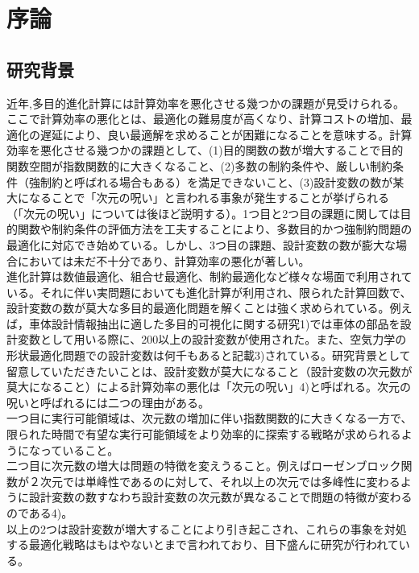 \documentclass[11pt,a4j,notitlepage]{jreport}
\begin{document}
\titleoutput

\gtabstract

\tableofcontents
\listoffigures
\listoftables

\clearpage
{}

\chapter{序論}
\section{研究背景}
近年,多目的進化計算には計算効率を悪化させる幾つかの課題が見受けられる。ここで計算効率の悪化とは、最適化の難易度が高くなり、計算コストの増加、最適化の遅延により、良い最適解を求めることが困難になることを意味する。計算効率を悪化させる幾つかの課題として、(1)目的関数の数が増大することで目的関数空間が指数関数的に大きくなること、(2)多数の制約条件や、厳しい制約条件（強制約と呼ばれる場合もある）を満足できないこと、(3)設計変数の数が某大になることで「次元の呪い」と言われる事象が発生することが挙げられる（「次元の呪い」については後ほど説明する）。1つ目と2つ目の課題に関しては目的関数や制約条件の評価方法を工夫することにより、多数目的かつ強制約問題の最適化に対応でき始めている。しかし、3つ目の課題、設計変数の数が膨大な場合においては未だ不十分であり、計算効率の悪化が著しい。
\\
進化計算は数値最適化、組合せ最適化、制約最適化など様々な場面で利用されている。それに伴い実問題においても進化計算が利用され、限られた計算回数で、設計変数の数が莫大な多目的最適化問題を解くことは強く求められている。例えば，車体設計情報抽出に適した多目的可視化に関する研究1)では車体の部品を設計変数として用いる際に、200以上の設計変数が使用された。また、空気力学の形状最適化問題での設計変数は何千もあると記載3)されている。研究背景として留意していただきたいことは、設計変数が莫大になること（設計変数の次元数が莫大になること）による計算効率の悪化は「次元の呪い」4)と呼ばれる。次元の呪いと呼ばれるには二つの理由がある。\\一つ目に実行可能領域は、次元数の増加に伴い指数関数的に大きくなる一方で、限られた時間で有望な実行可能領域をより効率的に探索する戦略が求められるようになっていること。\\二つ目に次元数の増大は問題の特徴を変えうること。例えばローゼンブロック関数が２次元では単峰性であるのに対して、それ以上の次元では多峰性に変わるように設計変数の数すなわち設計変数の次元数が異なることで問題の特徴が変わるのである4)。\\以上の2つは設計変数が増大することにより引き起こされ、これらの事象を対処する最適化戦略はもはやないとまで言われており、目下盛んに研究が行われている。
\end{document}

